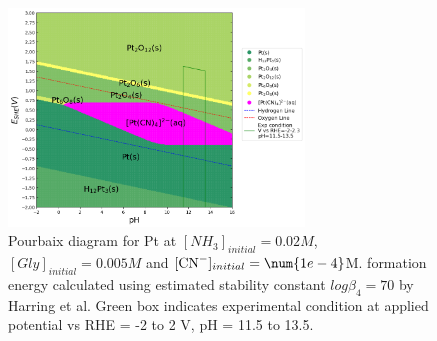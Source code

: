 \documentclass[journal=jacsat,manuscript=article,email=false]{achemso}
\begin{document}
\begin{figure}[htbp]
    \centering
    \includegraphics[width=0.7\textwidth]{Figures/pourbaix_diagrams/Pt-NH3-H2O_activity_Harrington_Pt_70=1e-04_[NH3]=0.02M_[Gly]=0.005M_[CN]=0.0001.png}
    \caption{Pourbaix diagram for Pt at $[NH_3]_{initial}= 0.02M$, $[Gly]_{initial}=0.005M$ and $[\ce{CN-}]_{initial}=\num{1e-4}$M.  formation energy calculated using estimated stability constant $log\beta_4=70$ by Harring et al.\cite{Harrington2005DeterminationIon} Green box indicates experimental condition at applied potential vs RHE = -2 to 2 V, pH = 11.5 to 13.5.}
    \label{fig:Pt_Pourbaix_Harrington_SI}
\end{figure}

\newpage


\newpage


\newpage


\newpage
% 

\end{document}
